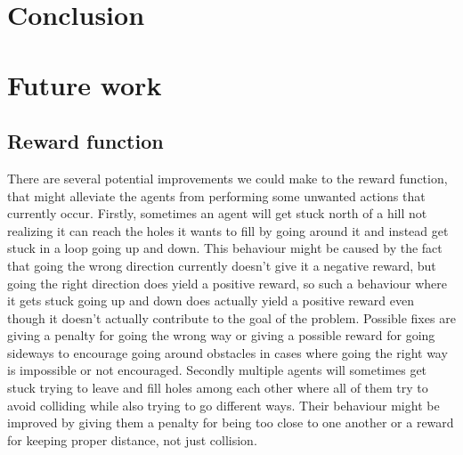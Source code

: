 \documentclass[conference]{IEEEtran}
\begin{document}



	\noindent


	\section{Conclusion}




	\section{Future work}
	\subsection{Reward function}
	There are several potential improvements we could make to the reward function, that might alleviate the agents from performing some unwanted actions that currently occur.
	Firstly, sometimes an agent will get stuck north of a hill not realizing it can reach the holes it wants to fill by going around it and instead get stuck in a loop going up and down.
	This behaviour might be caused by the fact that going the wrong direction currently doesn't give it a negative reward, but going the right direction does yield a positive reward, so such a behaviour where it gets stuck going up and down does actually yield a positive reward even though it doesn't actually contribute to the goal of the problem.
	Possible fixes are giving a penalty for going the wrong way or giving a possible reward for going sideways to encourage going around obstacles in cases where going the right way is impossible or not encouraged.
	Secondly multiple agents will sometimes get stuck trying to leave and fill holes among each other where all of them try to avoid colliding while also trying to go different ways.
	Their behaviour might be improved by giving them a penalty for being too close to one another or a reward for keeping proper distance, not just collision.
\end{document}
